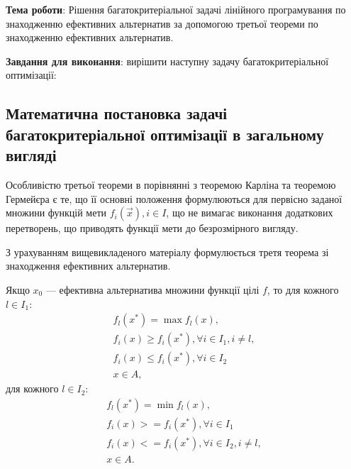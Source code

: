 


\newcommand{\labnumber}{3} %



\usepackage{systeme}
\usepackage{longtable,tabu}
\usepackage{multirow}
\usepackage{array,multirow}
\usepackage{pdflscape}
\usepackage{afterpage}
\usepackage{bm}

\graphicspath{{../figures/}}


\Ukrainian


\addtocounter{page}{1}

\textbf{Тема роботи}: Рішення багатокритеріальної задачі лінійного програмування по знаходженню ефективних альтернатив за допомогою третьої теореми по знаходженню ефективних альтернатив.

\textbf{Завдання для виконання}: вирішити наступну задачу багатокритеріальної оптимізації:


\subsection{Математична постановка задачі багатокритеріальної оптимізації в загальному вигляді}
Особливістю третьої теореми в порівнянні з теоремою Карліна та теоремою Гермейєра є те, що її основні положення формулюються для первісно заданої множини функцій мети ${f_i(\vec{x}), i \in I}$, що не вимагає виконання додаткових перетворень, що приводять функції мети до безрозмірного вигляду. 

З урахуванням вищевикладеного матеріалу формулюється третя теорема зі знаходження ефективних альтернатив.

Якщо $x_0$ --- ефективна альтернатива множини функції цілі $f$, то для кожного $l \in I_1$:
\begin{gather*} 
    f_l (x^*) = \max {f_l(x)}, \\
    f_i (x) \geq f_i(x^*), \forall i \in I_1, i \not = l, \\
    f_i (x) \leq f_i(x^*), \forall i \in I_2 \\
    x \in A,
\end{gather*}
для кожного $l \in I_2$:
\begin{gather*} 
    f_l (x^*) = \min{f_l(x)}, \\
    f_i (x) >= f_i(x^*), \forall i \in I_1 \\
    f_i (x) <= f_i(x^*), \forall i \in I_2, i \not = l, \\
    x \in A.
\end{gather*}

